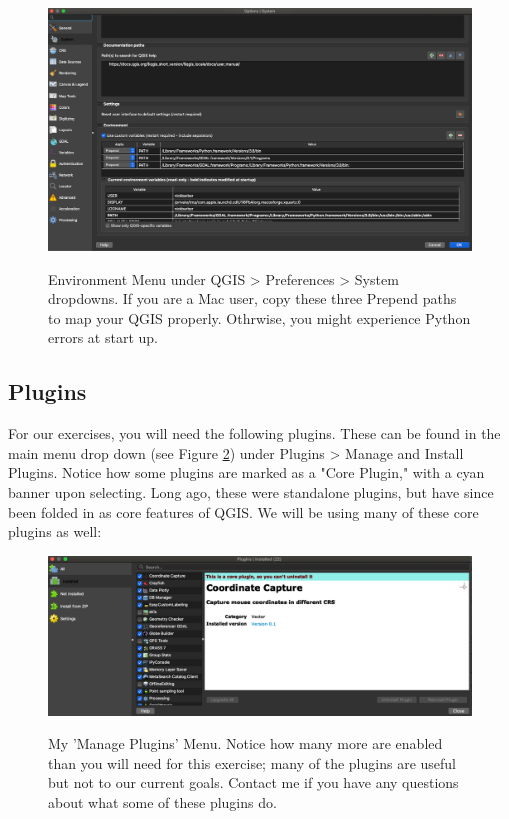 \documentclass{article}
\begin{document}
\begin{figure}[htbp]
    \centering
    \includegraphics[width=\textwidth]{Figure3_Environment_Paths.png}
    \label{fig:fig3}
    \caption{Environment Menu under QGIS > Preferences > System dropdowns. If you are a Mac user, copy these three Prepend paths to map your QGIS properly. Othrwise, you might experience Python errors at start up.}
\end{figure}

\subsection{Plugins}

For our exercises, you will need the following plugins. These can be found in the main menu drop down (see Figure \ref{fig4}) under Plugins > Manage and Install Plugins. Notice how some plugins are marked as a "Core Plugin," with a cyan banner upon selecting. Long ago, these were standalone plugins, but have since been folded in as core features of QGIS. We will be using many of these core plugins as well:

\begin{figure}[htbp]
    \centering
    \includegraphics[width=\textwidth]{FIgure4_Plugin_Menu.png}
    \label{fig4}
    \caption{My 'Manage Plugins' Menu. Notice how many more are enabled than you will need for this exercise; many of the plugins are useful but not to our current goals. Contact me if you have any questions about what some of these plugins do.}
\end{figure}
\end{document}
